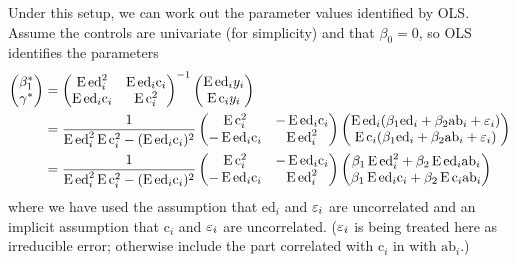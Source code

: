 \begin{itemize}[leftmargin=0pt]
  Under this setup, we can work out the parameter values identified by
  OLS. Assume the controls are univariate (for simplicity) and that
  $\beta_0 = 0$, so OLS identifies the parameters
  \newcommand{\ab}{\text{ab}}
  \newcommand{\ed}{\text{ed}}
  \newcommand{\co}{\text{c}}
  \begin{align*}
    \begin{pmatrix}
      \beta_1^* \\ \gamma^*
    \end{pmatrix} &=
    \begin{pmatrix}
      \E \ed_i^2 & \E \ed_i \co_i \\ \E \ed_i \co_i & \E \co_i^2
    \end{pmatrix}^{-1}
    \begin{pmatrix}
      \E \ed_i y_i \\ \E \co_i y_i
    \end{pmatrix}
    \\ &= \frac{1}{\E \ed_i^2 \E \co_i^2 - (\E \ed_i \co_i)^2}
    \begin{pmatrix}
      \E \co_i^2 & -\E \ed_i \co_i \\ -\E \ed_i \co_i & \E \ed_i^2
    \end{pmatrix}
    \begin{pmatrix}
      \E \ed_i (\beta_1 \ed_i + \beta_2 \ab_i + \vep_i) \\
      \E \co_i (\beta_1 \ed_i + \beta_2 \ab_i + \vep_i)
    \end{pmatrix} \\
    &= \frac{1}{\E \ed_i^2 \E \co_i^2 - (\E \ed_i \co_i)^2}
    \begin{pmatrix}
      \E \co_i^2 & -\E \ed_i \co_i \\ -\E \ed_i \co_i & \E \ed_i^2
    \end{pmatrix}
    \begin{pmatrix}
      \beta_1 \E \ed_i^2 + \beta_2 \E \ed_i \ab_i \\
      \beta_1 \E \ed_i \co_i + \beta_2 \E \co_i \ab_i
    \end{pmatrix}
  \end{align*}
  where we have used the assumption that $\ed_i$ and $\varepsilon_i$ are
  uncorrelated and an implicit assumption that $\co_i$ and $\varepsilon_i$
  are uncorrelated. ($\varepsilon_i$ is being treated here as irreducible
  error; otherwise include the part correlated with $\co_i$ in with
  $\ab_i$.)


\end{itemize}
